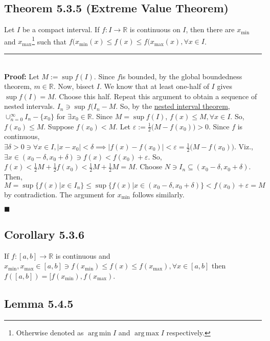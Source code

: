 \documentclass[11pt]{book}
\newcommand{\R}{\mathbb{R}}
\newcommand{\horline}{\noindent\rule{14.25cm}{0.6pt}\\}
\newcounter{theorem}
\DeclareMathOperator*{\argmax}{arg\,max}
\DeclareMathOperator*{\argmin}{arg\,min}
\newcommand{\QED}{\begin{flushright}$\blacksquare$\end{flushright}}
\begin{document}
	\subsection{Theorem 5.3.5 (Extreme Value Theorem)}
	\label{subsec:theor535}
		\begin{theor}
			Let $I$ be a compact interval. If $f: I \to \R$ is continuous on $I$, then there are $x_{\text{min}}$ and $x_{\text{max}}$\footnote{Otherwise denoted
			as $\argmin{I}$ and $\argmax{I}$ respectively.} such that $f(x_{\text{min}}(x) \leq f(x) \leq f(x_{\text{max}}(x), \forall x \in I$.\hfill\break
			\horline
			\textbf{Proof:} Let $M := \sup{f(I)}$. Since $f$is bounded, by the global boundedness theorem, $m \in \R$. Now, bisect $I$. We know that at least
			one-half of $I$ gives $\sup{f(I)} = M$. Choose this half. Repeat this argument to obtain a sequence of nested intervals. $I_n \ni \sup{f(I_n} - M$. So,
			by the \hyperref[subsec:theor332]{nested interval theorem}, $\displaystyle\cup_{n = 0}^{\infty}{I_n - \{x_0\}}$ for $\exists x_0 \in \R$. Since
			$M =  \sup{f(I)}$, $f(x) \leq M, \forall x \in I$. So, $f(x_0) \leq M$. Suppose $f(x_0) < M$. Let $\varepsilon := \frac{1}{2}\bigg(M - f(x_0)\bigg) > 0$.
			Since $f$ is continuous, $\exists \delta > 0 \ni \forall x \in I, |x - x_0| < \delta \implies |f(x) - f(x_0)| < \varepsilon = \frac{1}{2}\bigg(M - f(x_0)\bigg)$. Viz., $\exists x \in (x_0 - \delta, x_0 + \delta) \ni f(x) < f(x_0) + \varepsilon$. So, $f(x) < \frac{1}{2}M + \frac{1}{2}f(x_0) < \frac{1}{2}M + \frac{1}{2}M = M$. 
			Choose $N \ni I_n \subseteq (x_0 - \delta, x_0 + \delta)$. Then, $M = \sup{\{f(x) | x \in I_n\}} \leq \sup{\{f(x) | x \in (x_0 - \delta, x_0 + \delta)\}}
			< f(x_0) + \varepsilon = M$ by contradiction. The argument for $x_{\text{min}}$ follows similarly. \QED
		\end{theor}
	\subsection{Corollary 5.3.6}

	\label{subsec:cor536}
		\begin{cor}
			If $f:[a,b] \to \R$ is continuous and $x_{\min}, x_{\max} \in [a,b] \ni f(x_{\min}) \leq f(x) \leq f(x_{\max}), \forall x \in [a,b]$ then
			$f([a,b]) = [f(x_{\min}),f(x_{\max})$.
		\end{cor}
	\newpage		
	\subsection{Lemma 5.4.5}
\end{document}
